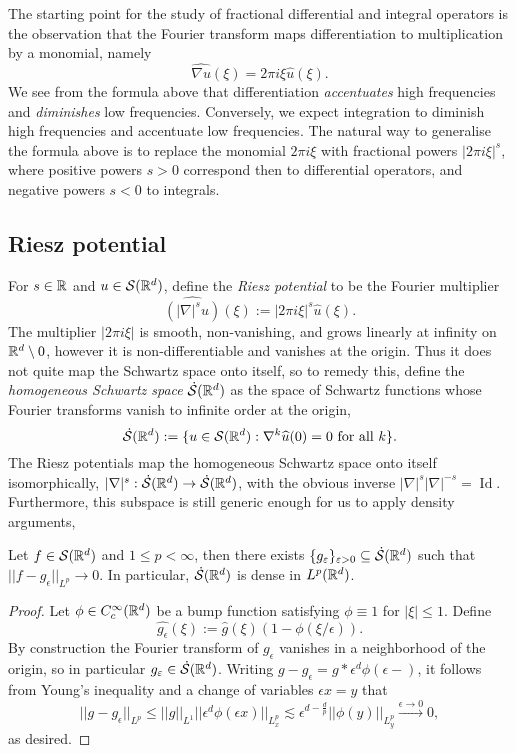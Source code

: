 The starting point for the study of fractional differential and integral operators is the observation that the Fourier transform maps differentiation to multiplication by a monomial, namely 
	\[\widehat{\nabla u} (\xi) = 2\pi i \xi \widehat u (\xi).\]
We see from the formula above that differentiation \textit{accentuates} high frequencies and \textit{diminishes} low frequencies. Conversely, we expect integration to diminish high frequencies and accentuate low frequencies. The natural way to generalise the formula above is to replace the monomial $2\pi i \xi$ with fractional powers $|2\pi i \xi|^s$, where positive powers $s > 0$ correspond then to differential operators, and negative powers $s < 0$ to integrals. 


\subsection{Riesz potential}

For $s \in \mathbb R$ and $u \in \mathcal S (\mathbb R^d)$, define the \emph{Riesz potential} to be the Fourier multiplier
	\[ \widehat{(|\nabla|^s u)} (\xi) := |2\pi i \xi|^s \widehat u(\xi).  \]	
The multiplier $|2\pi i \xi|$ is smooth, non-vanishing, and grows linearly at infinity on $\mathbb R^d \setminus 0$, however it is non-differentiable and vanishes at the origin. Thus it does not quite map the Schwartz space onto itself, so to remedy this, define the \emph{homogeneous Schwartz space} $\dot {\mathcal S} (\mathbb R^d)$ as the space of Schwartz functions whose Fourier transforms vanish to infinite order at the origin,  
	\[ \dot {\mathcal S} (\mathbb R^d) := \{ u \in \mathcal S (\mathbb R^d) : \nabla^k \widehat u (0) = 0 \text{ for all $k$} \}. \]
The Riesz potentials map the homogeneous Schwartz space onto itself isomorphically, $|\nabla|^s : \dot {\mathcal S} (\mathbb R^d) \to \dot {\mathcal S} (\mathbb R^d)$, with the obvious inverse $|\nabla|^s |\nabla|^{-s} = \operatorname{Id}$. Furthermore, this subspace is still generic enough for us to apply density arguments, 

\begin{lemma}
	Let $f \in \mathcal S(\mathbb R^d)$ and $1 \leq p < \infty$, then there exists $\{ g_\varepsilon\}_{\varepsilon > 0} \subseteq \dot {\mathcal S} (\mathbb R^d)$ such that $||f - g_\epsilon||_{L^p} \to 0$. In particular, $\dot {\mathcal S} (\mathbb R^d)$ is dense in $L^p (\mathbb R^d)$. 
\end{lemma}

\begin{proof}
	Let $\phi \in C^\infty_c (\mathbb R^d)$ be a bump function satisfying $\phi \equiv 1$ for $|\xi| \leq 1$. Define 
		\[ \widehat{g_\epsilon} (\xi) := \widehat g (\xi) (1 - \phi(\xi/\epsilon)). \]
	By construction the Fourier transform of $g_\epsilon$ vanishes in a neighborhood of the origin, so in particular $g_\varepsilon \in \dot {\mathcal S}  (\mathbb R^d)$. Writing $g - g_\epsilon = g * \epsilon^d \phi(\epsilon - )$, it follows from Young's inequality and a change of variables $\epsilon x = y$ that 
		\[ ||g - g_\epsilon||_{L^p} \leq ||g||_{L^1} ||\epsilon^d \phi(\epsilon x)||_{L^p_x} \lesssim \epsilon^{d - \frac{d}{p}} ||\phi(y)||_{L^p_y} \overset{\epsilon \to 0}{\longrightarrow} 0,  \]
	as desired. 	
\end{proof}

